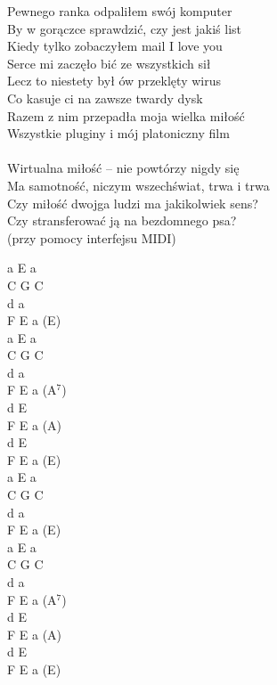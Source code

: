 \documentclass[a5paper, 10pt]{book}
\begin{document}
\begin{minipage}[t]{0.8\textwidth}
Pewnego ranka odpaliłem swój komputer\\
By w gorączce sprawdzić, czy jest jakiś list\\
Kiedy tylko zobaczyłem mail I love you\\
Serce mi zaczęło bić ze wszystkich sił\\
Lecz to niestety był ów przeklęty wirus\\
Co kasuje ci na zawsze twardy dysk\\
Razem z nim przepadła moja wielka miłość\\
Wszystkie pluginy i mój platoniczny film\\
\\
\hspace*{5mm}Wirtualna miłość – nie powtórzy nigdy się\\
\hspace*{5mm}Ma samotność, niczym wszechświat, trwa i trwa\\
\hspace*{5mm}Czy miłość dwojga ludzi ma jakikolwiek sens?\\
\hspace*{5mm}Czy stransferować ją na bezdomnego psa?\\
\hspace*{5mm}(przy pomocy interfejsu MIDI)

\end{minipage}
\begin{minipage}[t]{0.2\textwidth}
a E a\\
C G C\\
d a\\
F E a (E)\\
a E a\\
C G C\\
d a\\
F E a (A$^7$)\\

d E\\
F E a (A)\\
d E\\
F E a (E)\\

a E a\\
C G C\\
d a\\
F E a (E)\\
a E a\\
C G C\\
d a\\
F E a (A$^7$)\\

d E\\
F E a (A)\\
d E\\
F E a (E)\\
\end{minipage}
\end{document}
